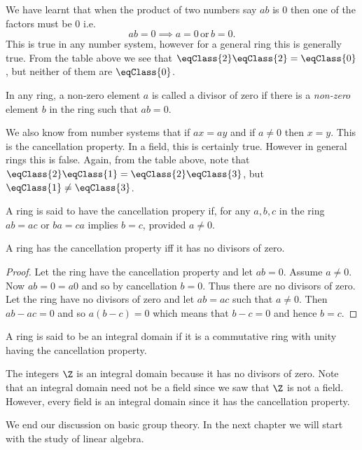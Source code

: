 We have learnt that when the product of two numbers say $ab$ is $0$ then one of the factors must be $0$ 
i.e.~\[ab = 0 \implies a=0\,\text{or}\,b=0.\]
This is true in any number system, 
however for a general ring this is generally true. From the table above we see that
$\eqClass{2}\eqClass{2} = \eqClass{0}$, but neither of them are $\eqClass{0}$.
\begin{Definition}[name=Divisors of zero]
    In any ring, a non-zero element $a$ is called a divisor of zero if there is a \emph{non-zero} element $b$
    in the ring such that $ab = 0$.
\end{Definition}
We also know from number systems that if $ax = ay$ and if $a \neq 0$ then $x = y$. This is the cancellation
property. In a field, this is certainly true. However in general rings this is false. Again, from the table
above, note that $\eqClass{2}\eqClass{1} = \eqClass{2}\eqClass{3}$, but $\eqClass{1}\neq\eqClass{3}$.
\begin{Definition}[name=Cancellation property]
    A ring is said to have the cancellation propery if, for any $a,b,c$ in the ring 
    $ab = ac$ or $ba = ca$ implies $b = c$, provided $a
    \neq 0$.
\end{Definition}
\begin{Proposition}
    A ring has the cancellation property iff it has no divisors of zero.
\end{Proposition}
\begin{proof}
    Let the ring have the cancellation property and let $ab = 0$. Assume $a \neq 0$. Now $ab = 0 = a0$ and so
    by cancellation $b = 0$. Thus there are no divisors of zero.
    Let the ring have no divisors of zero and let $ab = ac$ such that $a \neq 0$. Then $ab - ac = 0$ and so
    $a(b-c) = 0$ which means that $b-c = 0$ and hence $b = c$.
\end{proof}
\begin{Definition}[name=Integral domain]
    A ring is said to be an integral domain if it is a commutative ring with unity having the cancellation
    property.
\end{Definition}
\begin{Example}
    The integers $\Z$ is an integral domain because it has no divisors of zero. Note that an integral domain
    need not be a field since we saw that $\Z$ is not a field. However, every field is an integral domain
    since it has the cancellation property.
\end{Example}
We end our discussion on basic group theory. In the next chapter we will start with the study of linear
algebra.
\endinput

